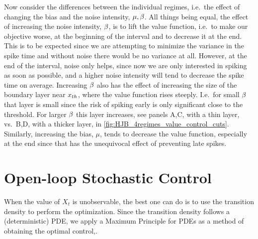 \documentclass[12pt]{iopart}
\begin{document}
Now consider the differences between the individual regimes, i.e.\ the
effect of changing the bias and the noise intensity, ${\mu },{\beta}$. All things being
equal, the effect of increasing the noise intensity, ${\beta}$, is to lift the value
function, i.e.\ to make our objective worse, at the beginning of the interval
and to decrease it at the end. This is to be expected since we are attempting to
minimize the variance in the spike time and without noise there would be no
variance at all. However, at the end of the interval, noise only helps, since
now we are only interested in spiking as soon as possible, and a higher noise
intensity will tend to decrease the spike time on average. Increasing ${\beta}$ also
has the effect of increasing the size of the boundary layer near ${ x_{th} }$, where
the value function rises steeply. I.e.\ for small ${\beta}$ that layer is small since
the risk of spiking early is only significant close to the threshold. For larger
${\beta}$ this layer increases, see panels A,C, with a thin layer, vs.\ B,D, with a
thicker layer, in \cref{fig:HJB_4regimes_value_control_cuts}. Similarly,
increasing the bias, $\mu$, tends to decrease the value function, especially at
the end since that has the unequivocal effect of preventing late spikes.

\section{Open-loop Stochastic Control}
When the value of $X_t$ is unobservable, the best
one can do is to use the transition density to perform the optimization. Since the
transition density follows a (deterministic) PDE, we apply a Maximum
Principle for PDEs as a method of obtaining the optimal control,\cite{Borzi2012}.
\end{document}
